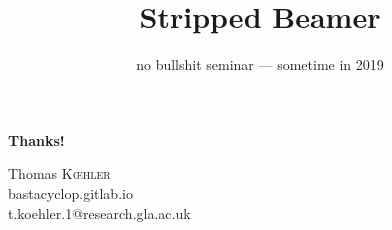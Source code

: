 \documentclass[landscape, dvipsnames]{beamer}
\title{Stripped Beamer}
\author{\theauthor}
\institute{
  in collaboration with John {\scshape Doe}
}
\date[2019]{\footnotesize no bullshit seminar --- sometime in 2019}
\def\theauthor{Thomas {\scshape K{\oe}hler}}
\begin{document}
\begin{frame}
\titlepage
\end{frame}




\begin{frame}
    \begin{center}
        \textbf{\Large Thanks!}
    \end{center}

    \bigskip

    \begin{center}
        \theauthor \\
        \faGlobe{} bastacyclop.gitlab.io \\
        \faEnvelope{} t.koehler.1@research.gla.ac.uk
    \end{center}
\end{frame}
\end{document}
